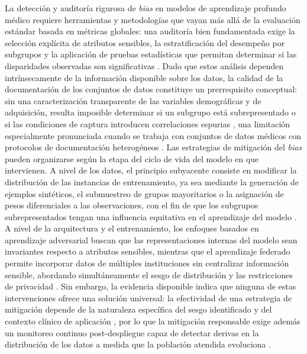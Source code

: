 La detección y auditoría rigurosa de \textit{bias} en modelos de aprendizaje profundo médico requiere herramientas y metodologías que vayan más allá de la evaluación estándar basada en métricas globales: una auditoría bien fundamentada exige la selección explícita de atributos sensibles, la estratificación del desempeño por subgrupos y la aplicación de pruebas estadísticas que permitan determinar si las disparidades observadas son significativas \citep{stanley2024}. Dado que estos análisis dependen intrínsecamente de la información disponible sobre los datos, la calidad de la documentación de los conjuntos de datos constituye un prerrequisito conceptual: sin una caracterización transparente de las variables demográficas y de adquisición, resulta imposible determinar si un subgrupo está subrepresentado o si las condiciones de captura introducen correlaciones espurias \citep{galanty2024}, una limitación especialmente pronunciada cuando se trabaja con conjuntos de datos médicos con protocolos de documentación heterogéneos \citep{drenkow2025}. Las estrategias de mitigación del \textit{bias} pueden organizarse según la etapa del ciclo de vida del modelo en que intervienen. A nivel de los datos, el principio subyacente consiste en modificar la distribución de las instancias de entrenamiento, ya sea mediante la generación de ejemplos sintéticos, el submuestreo de grupos mayoritarios o la asignación de pesos diferenciales a las observaciones, con el fin de que los subgrupos subrepresentados tengan una influencia equitativa en el aprendizaje del modelo \citep{yang2024survey}. A nivel de la arquitectura y el entrenamiento, los enfoques basados en aprendizaje adversarial buscan que las representaciones internas del modelo sean invariantes respecto a atributos sensibles, mientras que el aprendizaje federado permite incorporar datos de múltiples instituciones sin centralizar información sensible, abordando simultáneamente el sesgo de distribución y las restricciones de privacidad \citep{yang2024survey}. Sin embargo, la evidencia disponible indica que ninguna de estas intervenciones ofrece una solución universal: la efectividad de una estrategia de mitigación depende de la naturaleza específica del sesgo identificado y del contexto clínico de aplicación \citep{mittermaier2023}, por lo que la mitigación responsable exige además un monitoreo continuo post-despliegue capaz de detectar derivas en la distribución de los datos a medida que la población atendida evoluciona \citep{prenner2024}.

